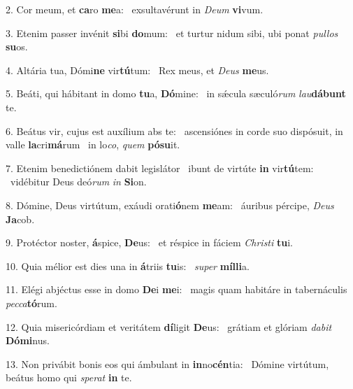 2. Cor meum, et \textbf{ca}ro \textbf{me}a: \ast\  exsultavérunt in \textit{De}\textit{um} \textbf{vi}vum.\

3. Etenim passer invénit \textbf{si}bi \textbf{do}mum: \ast\  et turtur nidum sibi, ubi ponat \textit{pul}\textit{los} \textbf{su}os.\

4. Altária tua, Dómi\textbf{ne} vir\textbf{tú}tum: \ast\  Rex meus, et \textit{De}\textit{us} \textbf{me}us.\

5. Beáti, qui hábitant in domo \textbf{tu}a, \textbf{Dó}mine: \ast\  in sǽcula sæculó\textit{rum} \textit{lau}\textbf{dá}\textbf{bunt} te.\

6. Beátus vir, cujus est auxílium abs te: \dag\  ascensiónes in corde suo dispósuit, in valle \textbf{la}cri\textbf{má}rum \ast\  in lo\textit{co}, \textit{quem} \textbf{pó}\textbf{su}it.\

7. Etenim benedictiónem dabit legislátor \dag\  ibunt de virtúte \textbf{in} vir\textbf{tú}tem: \ast\  vidébitur Deus deó\textit{rum} \textit{in} \textbf{Si}on.\

8. Dómine, Deus virtútum, exáudi orati\textbf{ó}nem \textbf{me}am: \ast\  áuribus pércipe, \textit{De}\textit{us} \textbf{Ja}cob.\

9. Protéctor noster, \textbf{á}spice, \textbf{De}us: \ast\  et réspice in fáciem \textit{Chris}\textit{ti} \textbf{tu}i.\

10. Quia mélior est dies una in \textbf{á}triis \textbf{tu}is: \ast\  \textit{su}\textit{per} \textbf{míl}\textbf{li}a.\

11. Elégi abjéctus esse in domo \textbf{De}i \textbf{me}i: \ast\  magis quam habitáre in tabernáculis \textit{pec}\textit{ca}\textbf{tó}rum.\

12. Quia misericórdiam et veritátem \textbf{dí}ligit \textbf{De}us: \ast\  grátiam et glóriam \textit{da}\textit{bit} \textbf{Dó}\textbf{mi}nus.\

13. Non privábit bonis eos qui ámbulant in \textbf{in}no\textbf{cén}tia: \ast\  Dómine virtútum, beátus homo qui \textit{spe}\textit{rat} \textbf{in} te.\

